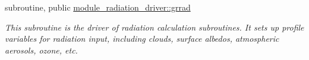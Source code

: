 {\bf }\par
\begin{DoxyCompactItemize}
\item 
subroutine, public \hyperlink{group__module__radiation__driver_ga4e6655c28036ea47bc70541f7db0f1ce}{module\+\_\+radiation\+\_\+driver\+::grrad}
\begin{DoxyCompactList}\small\item\em This subroutine is the driver of radiation calculation subroutines. It sets up profile variables for radiation input, including clouds, surface albedos, atmospheric aerosols, ozone, etc. \end{DoxyCompactList}\end{DoxyCompactItemize}

